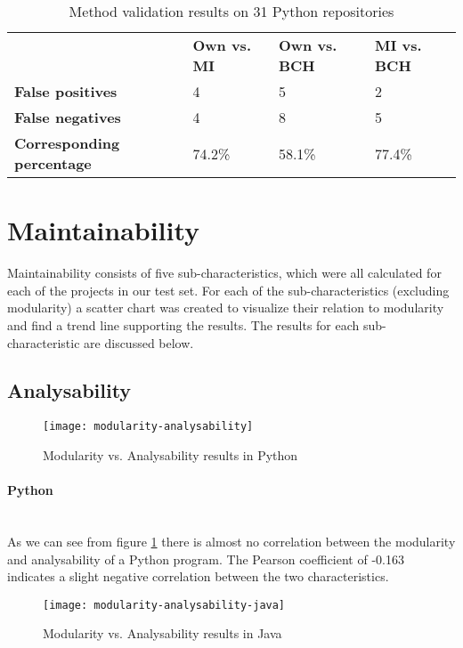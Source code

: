\documentclass[twoside]{uva-inf-bachelor-thesis}
\newcommand{\myparagraph}[1]{\paragraph{#1}\mbox{}\\}
\begin{document}
\begin{table}[H]
\centering
\caption{Method validation results on 31 Python repositories}
\label{table:validation}
\begin{tabular}{llll}
\textbf{}                         & \textbf{Own vs. MI} & \textbf{Own vs. BCH} & \textbf{MI vs. BCH} \\ 
\textbf{False positives}          & 4                   & 5                    & 2                   \\
\textbf{False negatives}          & 4                   & 8                    & 5                   \\
\textbf{Corresponding percentage} & 74.2\%              & 58.1\%               & 77.4\%             
\end{tabular}
\end{table}

\section{Maintainability}
Maintainability consists of five sub-characteristics, which were all calculated for each of the projects in our test set. For each of the sub-characteristics (excluding modularity) a scatter chart was created to visualize their relation to modularity and find a trend line supporting the results. The results for each sub-characteristic are discussed below.

\subsection{Analysability}

\begin{figure}[H]
    \caption{Modularity vs. Analysability results in Python}
    \label{figure:mod-analysis}
    \centering
        \texttt{[image: modularity-analysability]}
\end{figure}

\myparagraph{Python}
As we can see from figure \ref{figure:mod-analysis} there is almost no correlation between the modularity and analysability of a Python program. The Pearson coefficient of -0.163 indicates a slight negative correlation between the two characteristics.

\begin{figure}[H]
    \caption{Modularity vs. Analysability results in Java}
    \label{figure:mod-analysis-java}
    \centering
        \texttt{[image: modularity-analysability-java]}
\end{figure}
\end{document}
